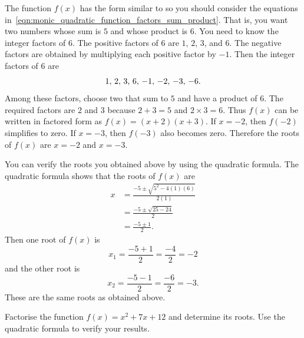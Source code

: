 \documentclass[a4paper,oneside,12pt]{article}
\begin{document}
\begin{solution}
The function $f(x)$ has the form similar to
 so you should consider the
equations
in~\eqref{eqn:monic_quadratic_function_factors_sum_product}.  That is,
you want two numbers whose sum is $5$ and whose product is $6$.  You
need to know the integer factors of $6$.  The positive factors of $6$
are $1$, $2$, $3$, and $6$.  The negative factors are obtained by
multiplying each positive factor by $-1$.  Then the integer factors of
$6$ are
\[
{1},\, {2},\, {3},\, {6},\, {-1},\, {-2},\, {-3},\, {-6}.
\]
Among these factors, choose two that sum to $5$ and have a product of
$6$.  The required factors are $2$ and $3$ because $2 + 3 = 5$ and
$2 \times 3 = 6$.  Thus $f(x)$ can be written in factored form as
$f(x) = (x + 2) (x + 3)$.  If $x = -2$, then $f(-2)$ simplifies to
zero.  If $x = -3$, then $f(-3)$ also becomes zero.  Therefore the
roots of $f(x)$ are $x = -2$ and $x = -3$.

You can verify the roots you obtained above by using the quadratic
formula.  The quadratic formula shows that the roots of $f(x)$ are
\begin{align*}
x
&=
\frac{
  -5
  \pm
  \sqrt{
    5^2 - 4(1)(6)
  }
}{
  2(1)
} \\[4pt]
&=
\frac{
  -5
  \pm
  \sqrt{
    25 - 24
  }
}{
  2
} \\[4pt]
&=
\frac{
  -5 \pm 1
}{
  2
}.
\end{align*}
Then one root of $f(x)$ is
\[
x_1
=
\frac{-5 + 1}{2}
=
\frac{-4}{2}
=
-2
\]
and the other root is
\[
x_2
=
\frac{-5 - 1}{2}
=
\frac{-6}{2}
=
-3.
\]
These are the same roots as obtained above.
\end{solution}

\begin{exercise}
Factorise the function $f(x) = x^2 + 7x + 12$ and determine its
roots.  Use the quadratic formula to verify your results.
\end{exercise}

\end{document}
